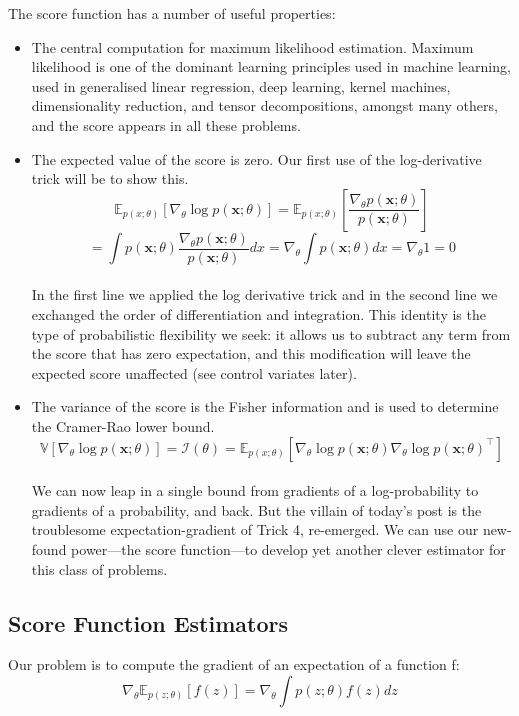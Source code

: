 \documentclass[14pt,a4paper]{report}  %
\begin{document}
\begin{large}
{The score function has a number of useful properties:}
\end{large}
\begin{itemize}
\item The central computation for maximum likelihood estimation. Maximum likelihood is one of the dominant learning principles used in machine learning, used in generalised linear regression, deep learning, kernel machines, dimensionality reduction, and tensor decompositions, amongst many others, and the score appears in all these problems. 
\end{itemize}
\begin{itemize}
\item The expected value of the score is zero. Our first use of the log-derivative trick will be to show this.\\
$$\mathbb{E}_{p(x; \theta)}[\nabla_\theta \log p(\mathbf{x}; \theta)] =\mathbb{E}_{p(x; \theta)}\left[\frac{\nabla_\theta p(\mathbf {x}; \theta)}{p(\mathbf{x}; \theta)} \right]$$
$$= \int p(\mathbf {x}; \theta) \frac{\nabla_\theta p(\mathbf {x}; \theta)}{p(\mathbf{x}; \theta)} dx= \nabla_\theta \int p(\mathbf{x}; \theta) dx=\nabla_\theta 1 = 0$$\\
\qquad In the first line we applied the log derivative trick and in the second line we exchanged the order of differentiation and integration. This identity is the type of probabilistic flexibility we seek: it allows us to subtract any term from the score that has zero expectation, and this modification will leave the expected score unaffected (see control variates later).
\end{itemize}
\begin{itemize}
\item The variance of the score is the Fisher information and is used to determine the Cramer-Rao lower bound.\\
$$\mathbb{V}[\nabla_\theta \log p(\mathbf{x}; \theta)] = \mathcal{I}(\theta) =\mathbb{E}_{p(x; \theta)}[\nabla_\theta \log p(\mathbf{x}; \theta)\nabla_\theta \log p(\mathbf{x}; \theta)^\top]$$\\
We can now leap in a single bound from gradients of a log-probability to gradients of a probability, and back. But the villain of today's post is the troublesome expectation-gradient of Trick 4, re-emerged. We can use our new-found power—the score function—to develop yet another clever estimator for this class of problems.
\end{itemize}
\subsection{Score Function Estimators}
Our problem is to compute the gradient of an expectation of a function f:\\
$$\nabla_\theta \mathbb{E}_{p(z;\theta)}[f(z)] =\nabla_\theta \int p(z; \theta)f(z) dz$$\\
\end{document}

